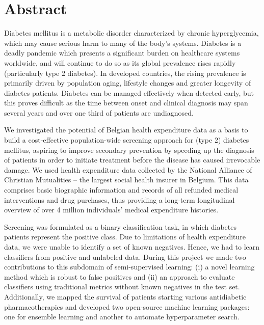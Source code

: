 \chapter{Abstract}                                 \label{ch:abstract}
Diabetes mellitus is a metabolic disorder characterized by chronic hyperglycemia, which may cause serious harm to many of the body's systems. Diabetes is a deadly pandemic which presents a significant burden on healthcare systems worldwide, and will continue to do so as its global prevalence rises rapidly (particularly type 2 diabetes). In developed countries, the rising prevalence is primarily driven by population aging, lifestyle changes and greater longevity of diabetes patients. Diabetes can be managed effectively when detected early, but this proves difficult as the time between onset and clinical diagnosis may span several years and over one third of patients are undiagnosed.


We investigated the potential of Belgian health expenditure data as a basis to build a cost-effective population-wide screening approach for (type 2) diabetes mellitus, aspiring to improve secondary prevention by speeding up the diagnosis of patients in order to initiate treatment before the disease has caused irrevocable damage. We used health expenditure data collected by the National Alliance of Christian Mutualities -- the largest social health insurer in Belgium. This data comprises basic biographic information and records of all refunded medical interventions and drug purchases, thus providing a long-term longitudinal overview of over 4 million individuals' medical expenditure histories.

Screening was formulated as a binary classification task, in which diabetes patients represent the positive class. Due to limitations of health expenditure data, we were unable to identify a set of known negatives. Hence, we had to learn classifiers from positive and unlabeled data. During this project we made two contributions to this subdomain of semi-supervised learning: (i) a novel learning method which is robust to false positives and (ii) an approach to evaluate classifiers using traditional metrics without known negatives in the test set. Additionally, we mapped the survival of patients starting various antidiabetic pharmacotherapies and developed two open-source machine learning packages: one for ensemble learning and another to automate hyperparameter search.

